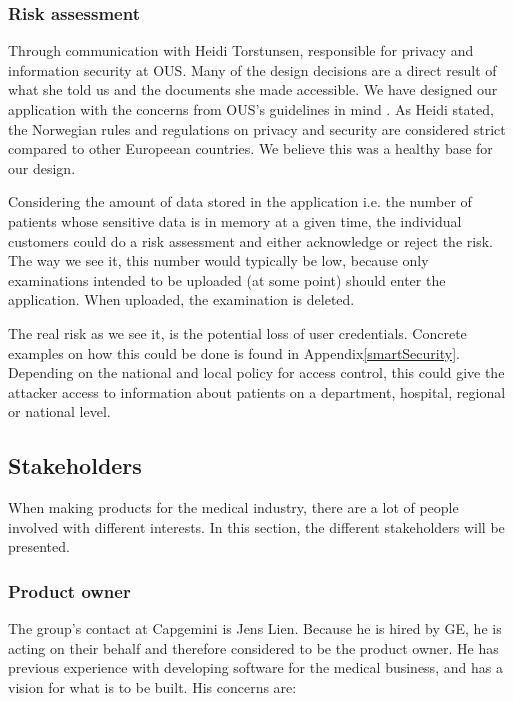 \subsubsection{Risk assessment}
Through communication with Heidi Torstunsen, responsible for privacy and information security at OUS. Many of the design decisions are a direct result of what she told us and the documents she made accessible. We have designed our application with the concerns from OUS's guidelines in mind \cite{ousDocuments_riskAssesment}. As Heidi stated, the Norwegian rules and regulations on privacy and security are considered strict compared to other Europeean countries. We believe this was a healthy base for our design.

Considering the amount of data stored in the application i.e. the number of patients whose sensitive data is in memory at a given time, the individual customers could do a risk assessment and either acknowledge or reject the risk. The way we see it, this number would typically be low, because only examinations intended to be uploaded (at some point) should enter the application. When uploaded, the examination is deleted. 

The real risk as we see it, is the potential loss of user credentials. Concrete examples on how this could be done is found in Appendix\ref{smartSecurity}. Depending on the national and local policy for access control, this could give the attacker access to information about patients on a department, hospital, regional or national level. 



\subsection{Stakeholders}
When making products for the medical industry, there are a lot of people involved with different interests. In this section, the different stakeholders will be presented.

\subsubsection{Product owner}
The group's contact at Capgemini is Jens Lien. Because he is hired by GE, he is acting on their behalf and therefore considered to be the product owner. He has previous experience with developing software for the medical business, and has a vision for what is to be built. His concerns are: 

